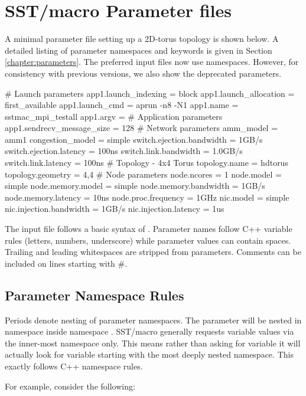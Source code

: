 
\section{SST/macro Parameter files}
\label{sec:parameters}
A minimal parameter file setting up a 2D-torus topology is shown below. 
A detailed listing of parameter namespaces and keywords is given in Section \ref{chapter:parameters}.
The preferred input files now use namespaces.
However, for consistency with previous versions, we also show the deprecated parameters.

\begin{ViFile}
# Launch parameters
app1.launch_indexing = block
app1.launch_allocation = first_available
app1.launch_cmd = aprun -n8 -N1
app1.name = sstmac_mpi_testall
app1.argv =
# Application parameters
app1.sendrecv_message_size = 128
# Network parameters
amm_model = amm1
congestion_model = simple
switch.ejection.bandwidth = 1GB/s
switch.ejection.latency = 100ns
switch.link.bandwidth = 1.0GB/s
switch.link.latency = 100ns
# Topology - 4x4 Torus
topology.name = hdtorus
topology.geometry = 4,4
# Node parameters
node.ncores = 1
node.model = simple
node.memory.model = simple
node.memory.bandwidth = 1GB/s
node.memory.latency = 10ns
node.proc.frequency = 1GHz
nic.model = simple
nic.injection.bandwidth = 1GB/s
nic.injection.latency = 1us
\end{ViFile}
The input file follows a basic syntax of .  
Parameter names follow C++ variable rules (letters, numbers, underscore) while parameter values can contain spaces.  Trailing and leading whitespaces are stripped from parameters.
Comments can be included on lines starting with \#.

\subsection{Parameter Namespace Rules}
Periods denote nesting of parameter namespaces.
The parameter  will be nested in namespace  inside namespace .
SST/macro generally requests variable values via the inner-most namespace only.
This means rather than asking for variable  it will actually look for variable  starting with the most deeply nested namespace.
This exactly follows C++ namespace rules.

For example, consider the following:

